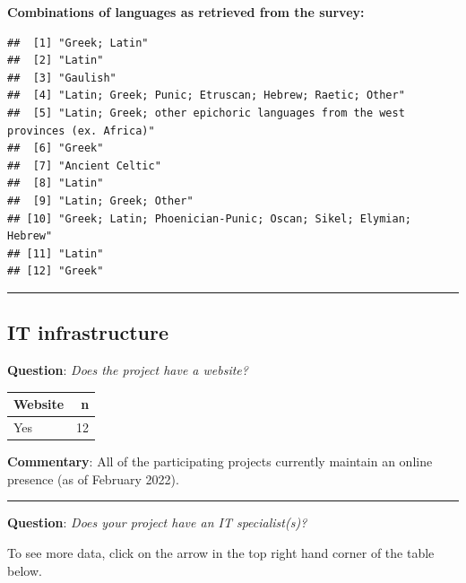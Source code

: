 \documentclass[
  10pt,
]{article}
\begin{document}
\textbf{Combinations of languages as retrieved from the survey:}

\begin{verbatim}
##  [1] "Greek; Latin"                                                                
##  [2] "Latin"                                                                       
##  [3] "Gaulish"                                                                     
##  [4] "Latin; Greek; Punic; Etruscan; Hebrew; Raetic; Other"                        
##  [5] "Latin; Greek; other epichoric languages from the west provinces (ex. Africa)"
##  [6] "Greek"                                                                       
##  [7] "Ancient Celtic"                                                              
##  [8] "Latin"                                                                       
##  [9] "Latin; Greek; Other"                                                         
## [10] "Greek; Latin; Phoenician-Punic; Oscan; Sikel; Elymian; Hebrew"               
## [11] "Latin"                                                                       
## [12] "Greek"
\end{verbatim}

\begin{center}\rule{0.5\linewidth}{0.5pt}\end{center}

\hypertarget{it-infrastructure}{%
\subsection{IT infrastructure}\label{it-infrastructure}}

\textbf{Question}: \emph{Does the project have a website?}

\begin{longtable}[]{@{}lr@{}}
\toprule
Website & n \\
\midrule
\endhead
Yes & 12 \\
\bottomrule
\end{longtable}

\textbf{Commentary}: All of the participating projects currently
maintain an online presence (as of February 2022).

\begin{center}\rule{0.5\linewidth}{0.5pt}\end{center}

\textbf{Question}: \emph{Does your project have an IT specialist(s)?}

To see more data, click on the arrow in the top right hand corner of the
table below.
\end{document}

